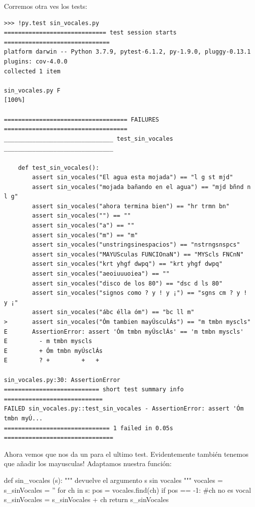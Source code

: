 Corremos otra ves los tests:

\begin{footnotesize}
\begin{Verbatim}[frame=single]
>>> !py.test sin_vocales.py
============================= test session starts ==============================
platform darwin -- Python 3.7.9, pytest-6.1.2, py-1.9.0, pluggy-0.13.1
plugins: cov-4.0.0
collected 1 item

sin_vocales.py F                                                         [100%]

=================================== FAILURES ===================================
_______________________________ test_sin_vocales _______________________________

    def test_sin_vocales():
        assert sin_vocales("El agua esta mojada") == "l g st mjd"
        assert sin_vocales("mojada bañando en el agua") == "mjd bñnd n l g"
        assert sin_vocales("ahora termina bien") == "hr trmn bn"
        assert sin_vocales("") == ""
        assert sin_vocales("a") == ""
        assert sin_vocales("m") == "m"
        assert sin_vocales("unstringsinespacios") == "nstrngsnspcs"
        assert sin_vocales("MAYUSculas FUNCIOnaN") == "MYScls FNCnN"
        assert sin_vocales("krt yhgf dwpq") == "krt yhgf dwpq"
        assert sin_vocales("aeoiuuuoiea") == ""
        assert sin_vocales("disco de los 80") == "dsc d ls 80"
        assert sin_vocales("signos como ? y ! y ¡") == "sgns cm ? y ! y ¡"
        assert sin_vocales("ábc élla óm") == "bc ll m"
>       assert sin_vocales("Óm tambien mayÚsculÁs") == "m tmbn myscls"
E       AssertionError: assert 'Óm tmbn myÚsclÁs' == 'm tmbn myscls'
E         - m tmbn myscls
E         + Óm tmbn myÚsclÁs
E         ? +         +   +

sin_vocales.py:30: AssertionError
=========================== short test summary info ============================
FAILED sin_vocales.py::test_sin_vocales - AssertionError: assert 'Óm tmbn myÚ...
============================== 1 failed in 0.05s ===============================
\end{Verbatim}
\end{footnotesize}

Ahora vemos que nos da un  para el ultimo test. Evidentemente también tenemos que añadir los mayusculas! Adaptamos nuestra función:


\begin{python}
def sin_vocales (s):
    """
    devuelve el argumento s sin vocales
    """
    vocales = 
    s_sinVocales = ''
    for ch in s:
        pos = vocales.find(ch)
        if pos == -1: #ch no es vocal
            s_sinVocales = s_sinVocales + ch     
    return s_sinVocales

\end{python}

